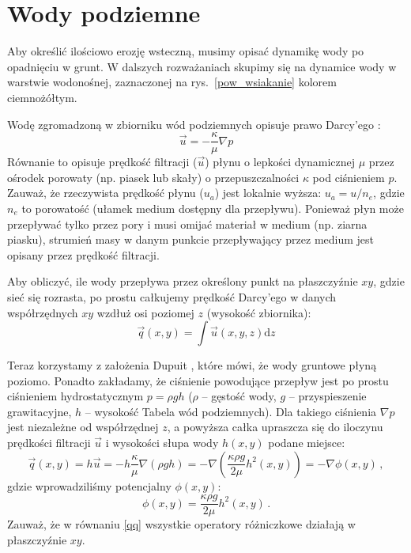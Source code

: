 \documentclass[]{pracamgr}
\begin{document}
    \section{Wody podziemne}

      Aby określić ilościowo erozję wsteczną, musimy opisać dynamikę wody po opadnięciu w grunt. W dalszych rozważaniach skupimy się na dynamice wody w warstwie wodonośnej, zaznaczonej na rys.~\ref{pow_wsiakanie} kolorem ciemnożółtym.

      Wodę zgromadzoną w zbiorniku wód podziemnych opisuje prawo Darcy'ego \cite{darcy1856fontaines}:
      \begin{equation}
        \vec{u}=-\frac{\kappa}{\mu} \nabla p
      \end{equation}	
      Równanie to opisuje prędkość filtracji ($\vec{u}$) płynu o lepkości dynamicznej $\mu$ przez ośrodek porowaty (np. piasek lub skały) o przepuszczalności $\kappa$ pod ciśnieniem $p$. Zauważ, że rzeczywista prędkość płynu ($u_a$) jest lokalnie wyższa: $u_a = u / n_e$, gdzie $n_e$ to porowatość (ułamek medium dostępny dla przepływu). Ponieważ płyn może przepływać tylko przez pory i musi omijać materiał w medium (np. ziarna piasku), strumień masy w danym punkcie przepływający przez medium jest opisany przez prędkość filtracji.
    
      Aby obliczyć, ile wody przepływa przez określony punkt na płaszczyźnie $xy$, gdzie sieć się rozrasta, po prostu całkujemy prędkość Darcy'ego w danych współrzędnych $xy$ wzdłuż osi poziomej $z$ (wysokość zbiornika):
      \begin{equation}
        \vec{q}(x,y)=\int \vec{u}(x,y,z)\textrm{d}z
      \end{equation}
    
      Teraz korzystamy z założenia Dupuit \cite{dupuit1863etudes}, które mówi, że wody gruntowe płyną poziomo. Ponadto zakładamy, że ciśnienie powodujące przepływ jest po prostu ciśnieniem hydrostatycznym $p = \rho g h $ ($\rho$ -- gęstość wody, $g$ -- przyspieszenie grawitacyjne, $h$ -- wysokość Tabela wód podziemnych). Dla takiego ciśnienia $\nabla p$ jest niezależne od współrzędnej $z$, a powyższa całka upraszcza się do iloczynu prędkości filtracji $\vec{u}$ i wysokości słupa wody $ h(x, y)$ podane miejsce:
      \begin{equation}
        \label{qq}
        \vec{q}(x,y)=h\vec{u}=-h \frac{\kappa}{\mu} \nabla(\rho g h)=-\nabla \left(\frac{\kappa \rho g}{2\mu}h^2(x,y)\right) = - \nabla \phi(x,y) \,,
      \end{equation}
      gdzie wprowadziliśmy potencjalny $\phi(x,y)$:
      \begin{equation}
        \phi(x,y) = \frac{\kappa \rho g}{2\mu}h^2(x,y) \,.
      \end{equation}
      Zauważ, że w równaniu \eqref{qq} wszystkie operatory różniczkowe działają w płaszczyźnie $xy$.
    
\end{document}
